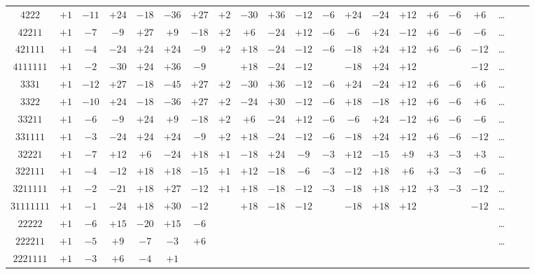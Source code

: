 \documentclass[11pt,a4paper]{book}
\begin{document}
\begin{center}
\begin{tabular}{c|c|c|c|c|c|c|c|c|c|c|c|c|c|c|c|c|c|c|c|c}
$4222$ & $+1$ & $-11$ & $+24$ & $-18$ & $-36$ & $+27$ & $+2$ & $-30$ & $+36$ & $-12$ & $-6$ & $+24$ & $-24$ & $+12$ & $+6$ & $-6$ & $+6$ & \dots \\
$42211$ & $+1$ & $-7$ & $-9$ & $+27$ & $+9$ & $-18$ & $+2$ & $+6$ & $-24$ & $+12$ & $-6$ & $-6$ & $+24$ & $-12$ & $+6$ & $-6$ & $-6$ & \dots \\
$421111$ & $+1$ & $-4$ & $-24$ & $+24$ & $+24$ & $-9$ & $+2$ & $+18$ & $-24$ & $-12$ & $-6$ & $-18$ & $+24$ & $+12$ & $+6$ & $-6$ & $-12$ & \dots \\
$4111111$ & $+1$ & $-2$ & $-30$ & $+24$ & $+36$ & $-9$ & & $+18$ & $-24$ & $-12$ & & $-18$ & $+24$ & $+12$ & & & $-12$ & \dots \\
$3331$ & $+1$ & $-12$ & $+27$ & $-18$ & $-45$ & $+27$ & $+2$ & $-30$ & $+36$ & $-12$ & $-6$ & $+24$ & $-24$ & $+12$ & $+6$ & $-6$ & $+6$ & \dots \\
$3322$ & $+1$ & $-10$ & $+24$ & $-18$ & $-36$ & $+27$ & $+2$ & $-24$ & $+30$ & $-12$ & $-6$ & $+18$ & $-18$ & $+12$ & $+6$ & $-6$ & $+6$ & \dots \\
$33211$ & $+1$ & $-6$ & $-9$ & $+24$ & $+9$ & $-18$ & $+2$ & $+6$ & $-24$ & $+12$ & $-6$ & $-6$ & $+24$ & $-12$ & $+6$ & $-6$ & $-6$ & \dots \\
$331111$ & $+1$ & $-3$ & $-24$ & $+24$ & $+24$ & $-9$ & $+2$ & $+18$ & $-24$ & $-12$ & $-6$ & $-18$ & $+24$ & $+12$ & $+6$ & $-6$ & $-12$ & \dots \\
$32221$ & $+1$ & $-7$ & $+12$ & $+6$ & $-24$ & $+18$ & $+1$ & $-18$ & $+24$ & $-9$ & $-3$ & $+12$ & $-15$ & $+9$ & $+3$ & $-3$ & $+3$ & \dots \\
$322111$ & $+1$ & $-4$ & $-12$ & $+18$ & $+18$ & $-15$ & $+1$ & $+12$ & $-18$ & $-6$ & $-3$ & $-12$ & $+18$ & $+6$ & $+3$ & $-3$ & $-6$ & \dots \\
$3211111$ & $+1$ & $-2$ & $-21$ & $+18$ & $+27$ & $-12$ & $+1$ & $+18$ & $-18$ & $-12$ & $-3$ & $-18$ & $+18$ & $+12$ & $+3$ & $-3$ & $-12$ & \dots \\
$31111111$ & $+1$ & $-1$ & $-24$ & $+18$ & $+30$ & $-12$ & & $+18$ & $-18$ & $-12$ & & $-18$ & $+18$ & $+12$ & & & $-12$ & \dots \\
$22222$ & $+1$ & $-6$ & $+15$ & $-20$ & $+15$ & $-6$ & & & & & & & & & & & & \dots \\
$222211$ & $+1$ & $-5$ & $+9$ & $-7$ & $-3$ & $+6$ & & & & & & & & & & & & \dots \\
$2221111$ & $+1$ & $-3$ & $+6$ & $-4$ & $+1$ & & & & & & & & & & & & &
\end{tabular}
\end{center}
\end{document}
